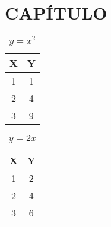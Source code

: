 %	
%	
%	
%
\section{CAPÍTULO}
\label{sec:capitulo2}

\lipsum

\begin{table}
	\centering
	\begin{tabular}{|c|c|}
		\hline
		X & Y \\
		\hline
		1 & 1 \\
		\hline
		2 & 4 \\
		\hline
		3 & 9 \\
		\hline
	\end{tabular}
	\caption{$y = x^2$}
\end{table}

\begin{table}
	\centering
	\begin{tabular}{|c|c|}
		\hline
		X & Y \\
		\hline
		1 & 2 \\
		\hline
		2 & 4 \\
		\hline
		3 & 6 \\
		\hline
	\end{tabular}
	\caption{$y = 2x$}
\end{table}
